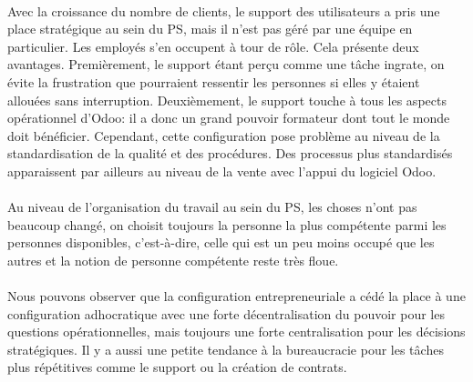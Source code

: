 \paragraph{} Avec la croissance du nombre de clients, le support des utilisateurs a pris une place stratégique au sein du PS, mais il n'est pas géré par une équipe en particulier. Les employés s'en occupent à tour de rôle. Cela présente deux avantages. Premièrement, le support étant perçu comme une tâche ingrate, on évite la frustration que pourraient ressentir les personnes si elles y étaient allouées sans interruption. Deuxièmement, le support touche à tous les aspects opérationnel d'Odoo: il a donc un grand pouvoir formateur dont tout le monde doit bénéficier. Cependant, cette configuration pose problème au niveau de la standardisation de la qualité et des procédures. Des processus plus standardisés apparaissent par ailleurs au niveau de la vente avec l'appui du logiciel Odoo. 

\paragraph{} Au niveau de l'organisation du travail au sein du PS, les choses n'ont pas beaucoup changé, on choisit toujours la personne la plus compétente parmi les personnes disponibles, c'est-à-dire, celle qui est un peu moins occupé que les autres et la notion de personne compétente reste très floue. 

\paragraph{} Nous pouvons observer que la configuration entrepreneuriale a cédé la place à une configuration adhocratique\citep[pp. 53-54]{pichault} avec une forte décentralisation du pouvoir pour les questions opérationnelles, mais toujours une forte centralisation pour les décisions stratégiques. Il y a aussi une petite tendance à la bureaucracie pour les tâches plus répétitives comme le support ou la création de contrats. 

